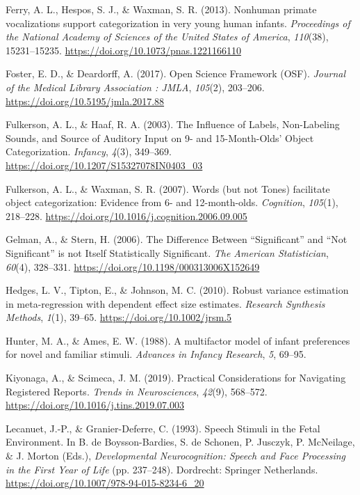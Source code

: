 \documentclass[man]{apa6}
\begin{document}
\leavevmode\hypertarget{ref-ferry_nonhuman_2013}{}%
Ferry, A. L., Hespos, S. J., \& Waxman, S. R. (2013). Nonhuman primate vocalizations support categorization in very young human infants. \emph{Proceedings of the National Academy of Sciences of the United States of America}, \emph{110}(38), 15231--15235. \url{https://doi.org/10.1073/pnas.1221166110}

\leavevmode\hypertarget{ref-foster_open_2017}{}%
Foster, E. D., \& Deardorff, A. (2017). Open Science Framework (OSF). \emph{Journal of the Medical Library Association : JMLA}, \emph{105}(2), 203--206. \url{https://doi.org/10.5195/jmla.2017.88}

\leavevmode\hypertarget{ref-fulkerson_influence_2003}{}%
Fulkerson, A. L., \& Haaf, R. A. (2003). The Influence of Labels, Non-Labeling Sounds, and Source of Auditory Input on 9- and 15-Month-Olds' Object Categorization. \emph{Infancy}, \emph{4}(3), 349--369. \url{https://doi.org/10.1207/S15327078IN0403_03}

\leavevmode\hypertarget{ref-fulkerson_words_2007}{}%
Fulkerson, A. L., \& Waxman, S. R. (2007). Words (but not Tones) facilitate object categorization: Evidence from 6- and 12-month-olds. \emph{Cognition}, \emph{105}(1), 218--228. \url{https://doi.org/10.1016/j.cognition.2006.09.005}

\leavevmode\hypertarget{ref-gelman_difference_2006}{}%
Gelman, A., \& Stern, H. (2006). The Difference Between ``Significant'' and ``Not Significant'' is not Itself Statistically Significant. \emph{The American Statistician}, \emph{60}(4), 328--331. \url{https://doi.org/10.1198/000313006X152649}

\leavevmode\hypertarget{ref-hedges_robust_2010}{}%
Hedges, L. V., Tipton, E., \& Johnson, M. C. (2010). Robust variance estimation in meta-regression with dependent effect size estimates. \emph{Research Synthesis Methods}, \emph{1}(1), 39--65. \url{https://doi.org/10.1002/jrsm.5}

\leavevmode\hypertarget{ref-hunter_multifactor_1988}{}%
Hunter, M. A., \& Ames, E. W. (1988). A multifactor model of infant preferences for novel and familiar stimuli. \emph{Advances in Infancy Research}, \emph{5}, 69--95.

\leavevmode\hypertarget{ref-kiyonaga_practical_2019}{}%
Kiyonaga, A., \& Scimeca, J. M. (2019). Practical Considerations for Navigating Registered Reports. \emph{Trends in Neurosciences}, \emph{42}(9), 568--572. \url{https://doi.org/10.1016/j.tins.2019.07.003}

\leavevmode\hypertarget{ref-lecanuet_speech_1993}{}%
Lecanuet, J.-P., \& Granier-Deferre, C. (1993). Speech Stimuli in the Fetal Environment. In B. de Boysson-Bardies, S. de Schonen, P. Jusczyk, P. McNeilage, \& J. Morton (Eds.), \emph{Developmental Neurocognition: Speech and Face Processing in the First Year of Life} (pp. 237--248). Dordrecht: Springer Netherlands. \url{https://doi.org/10.1007/978-94-015-8234-6_20}
\end{document}
